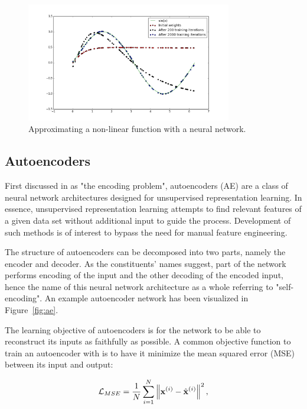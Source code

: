 \begin{figure}[!htb]
  \centering
  \includegraphics[width=0.8\textwidth]{images/function_approximation.png}
  \caption{Approximating a non-linear function with a neural network.}
  \label{fig:kl_divergence}
\end{figure}

\subsection{Autoencoders}
\label{subsection:autoencoders}

First discussed in \cite{encoding_problem} as "the encoding problem", autoencoders (AE) are a class of neural network architectures designed for unsupervised representation learning. In essence, unsupervised representation learning attempts to find relevant features of a given data set without additional input to guide the process. Development of such methods is of interest to bypass the need for manual feature engineering.

The structure of autoencoders can be decomposed into two parts, namely the encoder and decoder. As the constituents' names suggest, part of the network performs encoding of the input and the other decoding of the encoded input, hence the name of this neural network architecture as a whole referring to "self-encoding". An example autoencoder network has been visualized in Figure~\ref{fig:ae}.

The learning objective of autoencoders is for the network to be able to reconstruct its inputs as faithfully as possible. A common objective function to train an autoencoder with is to have it minimize the mean squared error (MSE) between its input and output:

\begin{equation}
  \mathcal{L}_{MSE} = \frac{1}{N} \sum_{i=1}^{N} \left\lVert\mathbf{x}^{(i)} - \hat{\mathbf{x}}^{(i)}\right\rVert^2,
  \label{eq:mse}
\end{equation}

